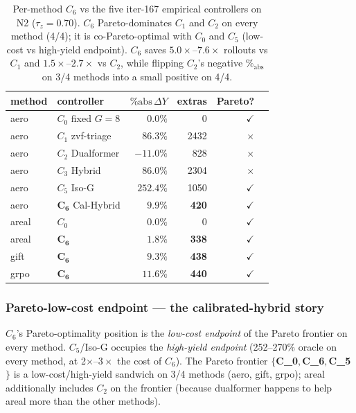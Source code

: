 \documentclass{article}
\begin{document}
\begin{table}[ht]
\centering
\small
\begin{tabular}{llrrrr}
\toprule
method & controller & $\%\mathrm{abs}\,\Delta Y$ & extras & Pareto? \\
\midrule
aero   & $C_0$ fixed $G{=}8$        & $0.0\%$         & 0     & $\checkmark$ \\
aero   & $C_1$ zvf-triage           & $86.3\%$        & 2432  & $\times$ \\
aero   & $C_2$ Dualformer           & $-11.0\%$       & 828   & $\times$ \\
aero   & $C_3$ Hybrid               & $86.0\%$        & 2304  & $\times$ \\
aero   & $C_5$ Iso-G                & $252.4\%$       & 1050  & $\checkmark$ \\
aero   & $\mathbf{C_6}$ Cal-Hybrid  & $\mathbf{9.9\%}$  & \textbf{420}   & $\checkmark$ \\
\midrule
areal  & $C_0$                      & $0.0\%$         & 0     & $\checkmark$ \\
areal  & $\mathbf{C_6}$             & $\mathbf{1.8\%}$  & \textbf{338}   & $\checkmark$ \\
\midrule
gift   & $\mathbf{C_6}$             & $\mathbf{9.3\%}$  & \textbf{438}   & $\checkmark$ \\
\midrule
grpo   & $\mathbf{C_6}$             & $\mathbf{11.6\%}$ & \textbf{440}   & $\checkmark$ \\
\bottomrule
\end{tabular}
\caption{Per-method $C_6$ vs the five iter-167 empirical controllers
on N2 ($\tau_z = 0.70$). $C_6$ Pareto-dominates $C_1$ and $C_2$ on every
method (4/4); it is co-Pareto-optimal with $C_0$ and $C_5$ (low-cost
vs high-yield endpoint). $C_6$ saves $5.0\times$--$7.6\times$ rollouts
vs $C_1$ and $1.5\times$--$2.7\times$ vs $C_2$, while flipping
$C_2$'s negative $\%_{\mathrm{abs}}$ on 3/4 methods into a small
positive on 4/4.}
\label{tab:p7-iter175-c6-summary}
\end{table}

\subsubsection*{Pareto-low-cost endpoint --- the calibrated-hybrid story}

$C_6$'s Pareto-optimality position is the \emph{low-cost endpoint} of
the Pareto frontier on every method. $C_5$/Iso-G occupies the
\emph{high-yield endpoint} (252--270\% oracle on every method, at
2$\times$--$3\times$ the cost of $C_6$). The Pareto frontier
{\bf $\{$C_0$, $C_6$, $C_5$\}$} is a low-cost/high-yield sandwich on
3/4 methods (aero, gift, grpo); areal additionally includes $C_2$ on
the frontier (because dualformer happens to help areal more than the
other methods).
\end{document}
